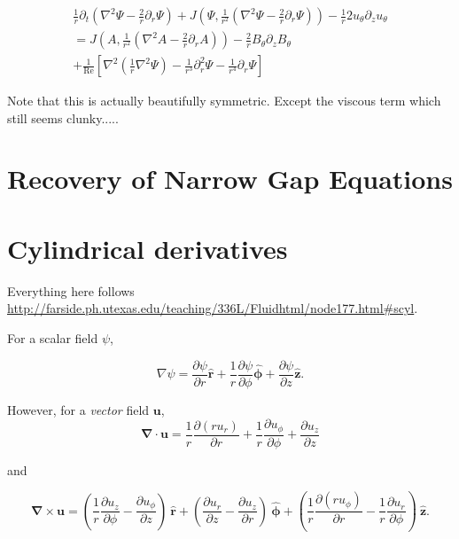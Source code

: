\documentclass{paper}
\newcommand{\uphi}{\ensuremath{u_\phi}}
\newcommand{\rhat}{\ensuremath{\mathbf{\hat{r}}}}
\newcommand{\phihat}{\ensuremath{\mathbf{\hat{\phi}}}}
\newcommand{\zhat}{\ensuremath{\mathbf{\hat{z}}}}
\newcommand\reye{\mathrm{Re}}
\begin{document}
\begin{multline}
\frac{1}{r}\partial_t \left(\nabla^2 \Psi - \frac{2}{r} \partial_r \Psi \right) + J\left(\Psi, \frac{1}{r^2} \left( \nabla^2 \Psi - \frac{2}{r} \partial_r\Psi\right) \right) - \frac{1}{r} 2 u_\theta \partial_z u_\theta \\
= J\left(A, \frac{1}{r^2} \left( \nabla^2 A - \frac{2}{r} \partial_rA\right) \right) - \frac{2}{r}B_\theta \partial_z B_\theta \\
+ \frac{1}{\reye} \left[ \nabla^2 \left(\frac{1}{r} \nabla^2 \Psi\right) - \frac{1}{r^3} \partial_r^2 \Psi - \frac{1}{r^4}\partial_r\Psi\right]
\end{multline}

Note that this is actually beautifully symmetric. Except the viscous term which still seems clunky.....

\section{Recovery of Narrow Gap Equations}
\label{sec:narrow_gap_recovery}

\appendix

\section{Cylindrical derivatives}
\label{sec:cylindrical_deriv}

Everything here follows \url{http://farside.ph.utexas.edu/teaching/336L/Fluidhtml/node177.html#scyl}.

For a scalar field $\psi$, 

\begin{equation}
  \label{eq:del_scalar}
  \nabla \psi = \frac{\partial \psi}{\partial r} \rhat + \frac{1}{r} \frac{\partial \psi}{\partial \phi} \phihat + \frac{\partial \psi}{\partial z} \zhat.
\end{equation}

However, for a \emph{vector} field $\mathbf{u}$,
\begin{equation}
  \label{eq:div}
  \mathbf{\nabla \cdot u} = \frac{1}{r} \frac{\partial (r u_r)}{\partial r} + \frac{1}{r} \frac{\partial \uphi}{\partial \phi}  + \frac{\partial u_z}{\partial z}
\end{equation}

and 

\begin{equation}
  \label{eq:curl}
  \mathbf{\nabla \times u} = \left( \frac{1}{r} \frac{\partial u_z}{\partial \phi} - \frac{\partial u_\phi}{\partial z}\right)\ \rhat + \left(\frac{\partial u_r}{\partial z} - \frac{\partial u_z}{\partial r}\right)\ \phihat  + \left( \frac{1}{r} \frac{\partial (r \uphi)}{\partial r} - \frac{1}{r}\frac{\partial u_r}{\partial \phi}\right)\ \zhat.
\end{equation}
\end{document}
